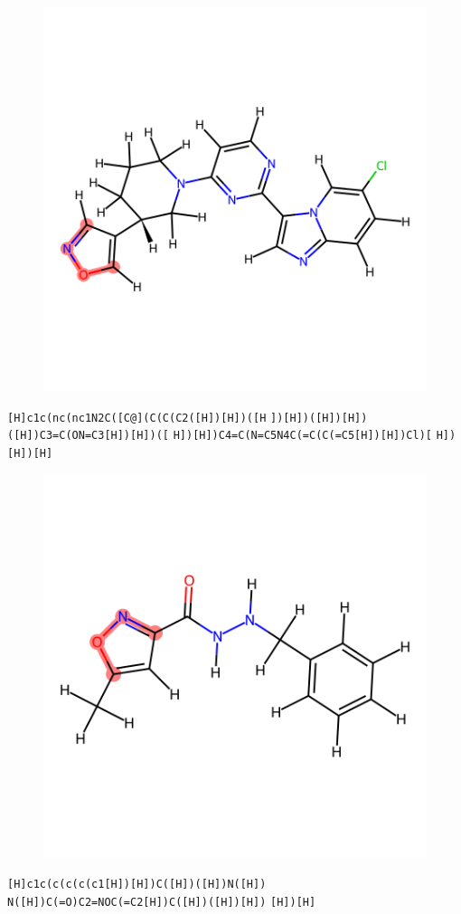 \documentclass{article}
\begin{document}
\begin{figure}[ht]
\centering
    \includegraphics{mol180.png}
\end{figure}
\verb|[H]c1c(nc(nc1N2C([C@](C(C(C2([H])[H])([H| \verb|])[H])([H])[H])([H])C3=C(ON=C3[H])[H])([| \verb|H])[H])C4=C(N=C5N4C(=C(C(=C5[H])[H])Cl)[| \verb|H])[H])[H]|

\begin{figure}[ht]
\centering
    \includegraphics{mol181.png}
\end{figure}
\verb|[H]c1c(c(c(c(c1[H])[H])C([H])([H])N([H])| \verb|N([H])C(=O)C2=NOC(=C2[H])C([H])([H])[H])| \verb|[H])[H]|
\end{document}
